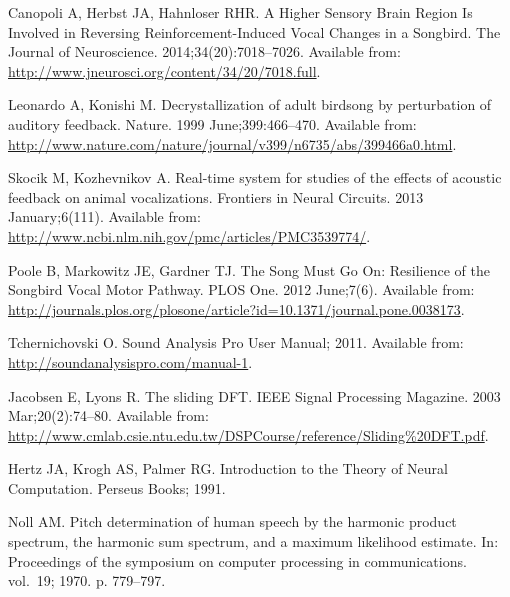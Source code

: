 \documentclass[10pt,letterpaper]{article}
\begin{document}
\begin{thebibliography}{10}
Canopoli A, Herbst JA, Hahnloser RHR.
\newblock A Higher Sensory Brain Region Is Involved in Reversing
  Reinforcement-Induced Vocal Changes in a Songbird.
\newblock The Journal of Neuroscience. 2014;34(20):7018--7026.
\newblock Available from:
  \url{http://www.jneurosci.org/content/34/20/7018.full}.

Leonardo A, Konishi M.
\newblock Decrystallization of adult birdsong by perturbation of auditory
  feedback.
\newblock Nature. 1999 June;399:466--470.
\newblock Available from:
  \url{http://www.nature.com/nature/journal/v399/n6735/abs/399466a0.html}.

Skocik M, Kozhevnikov A.
\newblock Real-time system for studies of the effects of acoustic feedback on
  animal vocalizations.
\newblock Frontiers in Neural Circuits. 2013 January;6(111).
\newblock Available from:
  \url{http://www.ncbi.nlm.nih.gov/pmc/articles/PMC3539774/}.

Poole B, Markowitz JE, Gardner TJ.
\newblock The Song Must Go On: Resilience of the Songbird Vocal Motor Pathway.
\newblock PLOS One. 2012 June;7(6).
\newblock Available from:
  \url{http://journals.plos.org/plosone/article?id=10.1371/journal.pone.0038173}.

Tchernichovski O. Sound Analysis Pro User Manual; 2011.
\newblock Available from: \url{http://soundanalysispro.com/manual-1}.

Jacobsen E, Lyons R.
\newblock The sliding DFT.
\newblock IEEE Signal Processing Magazine. 2003 Mar;20(2):74--80.
\newblock Available from:
  \url{http://www.cmlab.csie.ntu.edu.tw/DSPCourse/reference/Sliding\%20DFT.pdf}.

Hertz JA, Krogh AS, Palmer RG.
\newblock Introduction to the Theory of Neural Computation.
\newblock Perseus Books; 1991.

Noll AM.
\newblock Pitch determination of human speech by the harmonic product spectrum,
  the harmonic sum spectrum, and a maximum likelihood estimate.
\newblock In: Proceedings of the symposium on computer processing in
  communications. vol.~19; 1970. p. 779--797.

\end{thebibliography}
\end{document}
